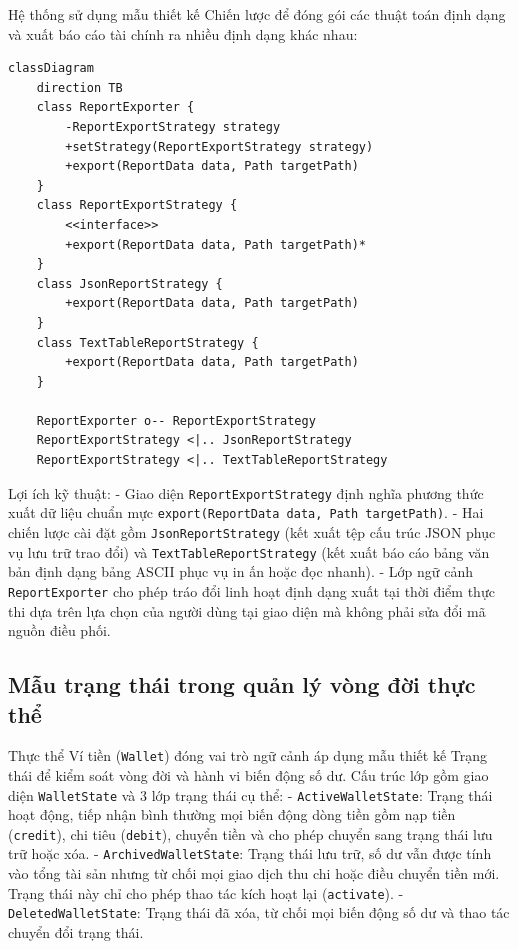 \documentclass[a4paper,12pt]{report}
\newcommand{\passthrough}[1]{#1}
\begin{document}
Hệ thống sử dụng mẫu thiết kế Chiến lược để đóng gói các thuật toán định
dạng và xuất báo cáo tài chính ra nhiều định dạng khác nhau:

\begin{lstlisting}
classDiagram
    direction TB
    class ReportExporter {
        -ReportExportStrategy strategy
        +setStrategy(ReportExportStrategy strategy)
        +export(ReportData data, Path targetPath)
    }
    class ReportExportStrategy {
        <<interface>>
        +export(ReportData data, Path targetPath)*
    }
    class JsonReportStrategy {
        +export(ReportData data, Path targetPath)
    }
    class TextTableReportStrategy {
        +export(ReportData data, Path targetPath)
    }

    ReportExporter o-- ReportExportStrategy
    ReportExportStrategy <|.. JsonReportStrategy
    ReportExportStrategy <|.. TextTableReportStrategy
\end{lstlisting}

Lợi ích kỹ thuật: - Giao diện
\passthrough{\lstinline!ReportExportStrategy!} định nghĩa phương thức
xuất dữ liệu chuẩn mực
\passthrough{\lstinline!export(ReportData data, Path targetPath)!}. -
Hai chiến lược cài đặt gồm \passthrough{\lstinline!JsonReportStrategy!}
(kết xuất tệp cấu trúc JSON phục vụ lưu trữ trao đổi) và
\passthrough{\lstinline!TextTableReportStrategy!} (kết xuất báo cáo bảng
văn bản định dạng bảng ASCII phục vụ in ấn hoặc đọc nhanh). - Lớp ngữ
cảnh \passthrough{\lstinline!ReportExporter!} cho phép tráo đổi linh
hoạt định dạng xuất tại thời điểm thực thi dựa trên lựa chọn của người
dùng tại giao diện mà không phải sửa đổi mã nguồn điều phối.

\subsection{Mẫu trạng thái trong quản lý vòng đời thực
thể}\label{mux1eabu-trux1ea1ng-thuxe1i-trong-quux1ea3n-luxfd-vuxf2ng-ux111ux1eddi-thux1ef1c-thux1ec3}

Thực thể Ví tiền (\passthrough{\lstinline!Wallet!}) đóng vai trò ngữ
cảnh áp dụng mẫu thiết kế Trạng thái để kiểm soát vòng đời và hành vi
biến động số dư. Cấu trúc lớp gồm giao diện
\passthrough{\lstinline!WalletState!} và 3 lớp trạng thái cụ thể: -
\passthrough{\lstinline!ActiveWalletState!}: Trạng thái hoạt động, tiếp
nhận bình thường mọi biến động dòng tiền gồm nạp tiền
(\passthrough{\lstinline!credit!}), chi tiêu
(\passthrough{\lstinline!debit!}), chuyển tiền và cho phép chuyển sang
trạng thái lưu trữ hoặc xóa. -
\passthrough{\lstinline!ArchivedWalletState!}: Trạng thái lưu trữ, số dư
vẫn được tính vào tổng tài sản nhưng từ chối mọi giao dịch thu chi hoặc
điều chuyển tiền mới. Trạng thái này chỉ cho phép thao tác kích hoạt lại
(\passthrough{\lstinline!activate!}). -
\passthrough{\lstinline!DeletedWalletState!}: Trạng thái đã xóa, từ chối
mọi biến động số dư và thao tác chuyển đổi trạng thái.
\end{document}
